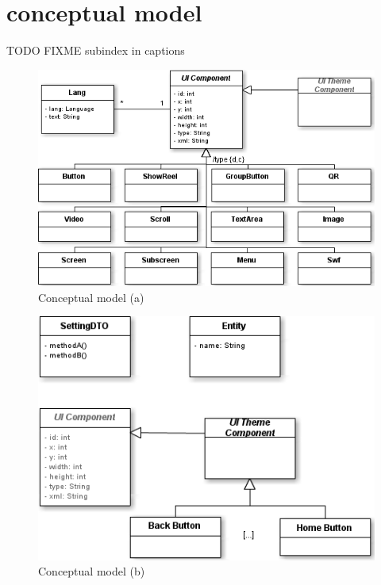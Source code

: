 \section{conceptual model}
TODO FIXME subindex in captions
\begin{figure}[htb]
    \label{fig:specification-conceptual-model-1}
    \centering
    \includegraphics[width=\textwidth]{figures/specification-conceptual-model-1}
    \caption{Conceptual model (a)}
\end{figure}

\begin{figure}[htb]
    \label{fig:specification-conceptual-model-2}
    \centering
    \includegraphics[width=\textwidth]{figures/specification-conceptual-model-2}
    \caption{Conceptual model (b)}
\end{figure}

